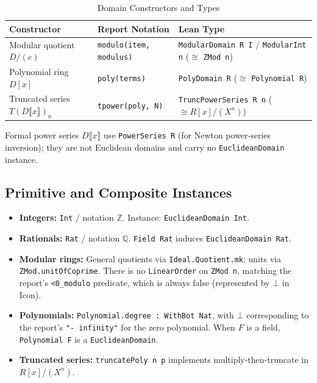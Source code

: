 \documentclass[11pt,a4paper]{article}
\begin{document}
\begin{table}[htbp]
\centering
\caption{Domain Constructors and Types}
\label{tab:domains}
\small
\begin{tabularx}{\textwidth}{@{}l>{\raggedright\arraybackslash}X>{\raggedright\arraybackslash}X@{}}
\toprule
\textbf{Constructor} & \textbf{Report Notation} & \textbf{Lean Type} \\
\midrule
Modular quotient $D/(e)$ & \texttt{modulo(item, modulus)} & \texttt{ModularDomain R I} / \texttt{ModularInt n} ($\cong$ \texttt{ZMod n}) \\
Polynomial ring $D[x]$ & \texttt{poly(terms)} & \texttt{PolyDomain R} ($\cong$ \texttt{Polynomial R}) \\
Truncated series $T(D\llbracket x\rrbracket)_n$ & \texttt{tpower(poly, N)} & \texttt{TruncPowerSeries R n} ($\cong R[x]/(X^n)$) \\
\bottomrule
\end{tabularx}
\end{table}

Formal power series $D\llbracket x\rrbracket$ use \texttt{PowerSeries R} (for Newton power-series inversion); they are not Euclidean domains and carry no \texttt{EuclideanDomain} instance.

\subsection{Primitive and Composite Instances}
\begin{itemize}
    \item \textbf{Integers:} \lstinline[style=leanbox]{Int} / notation $\mathbb{Z}$. Instance: \lstinline[style=leanbox]{EuclideanDomain Int}.
    \item \textbf{Rationals:} \lstinline[style=leanbox]{Rat} / notation $\mathbb{Q}$. \lstinline[style=leanbox]{Field Rat} induces \lstinline[style=leanbox]{EuclideanDomain Rat}.
    \item \textbf{Modular rings:} General quotients via \lstinline[style=leanbox]{Ideal.Quotient.mk}; units via \lstinline[style=leanbox]{ZMod.unitOfCoprime}. There is no \lstinline[style=leanbox]{LinearOrder} on \lstinline[style=leanbox]{ZMod n}, matching the report's \lstinline[style=leanbox]{<0_modulo} predicate, which is always false (represented by $\bot$ in Icon).
    \item \textbf{Polynomials:} \lstinline[style=leanbox]{Polynomial.degree : WithBot Nat}, with $\bot$ corresponding to the report's \lstinline[style=leanbox]{"- infinity"} for the zero polynomial. When $F$ is a field, \lstinline[style=leanbox]{Polynomial F} is a \lstinline[style=leanbox]{EuclideanDomain}.
    \item \textbf{Truncated series:} \texttt{truncatePoly n p} implements multiply-then-truncate in $R[x]/(X^n)$.
\end{itemize}
\end{document}
